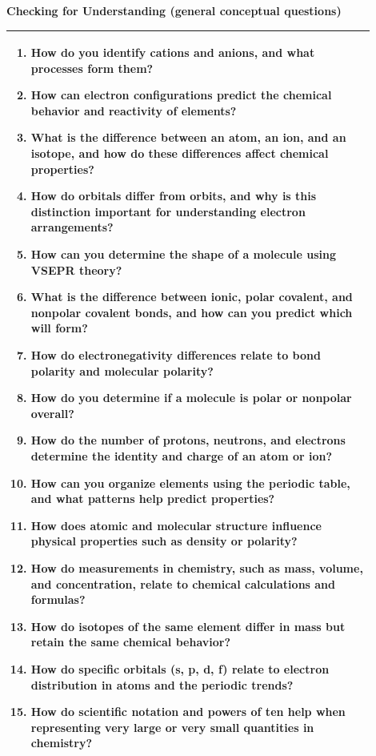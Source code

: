 \documentclass{article}
\begin{document}
{\newpage
{\large\textbf{Checking for Understanding (general conceptual questions)}}\\
\noindent \begin{tabular}{|p{0.9\linewidth}|}
\hline
\vspace{0.2cm}
\begin{enumerate}
    \item How do you identify cations and anions, and what processes form them?
    \item How can electron configurations predict the chemical behavior and reactivity of elements?
    \item What is the difference between an atom, an ion, and an isotope, and how do these differences affect chemical properties?
    \item How do orbitals differ from orbits, and why is this distinction important for understanding electron arrangements?
    \item How can you determine the shape of a molecule using VSEPR theory?
    \item What is the difference between ionic, polar covalent, and nonpolar covalent bonds, and how can you predict which will form?
    \item How do electronegativity differences relate to bond polarity and molecular polarity?
    \item How do you determine if a molecule is polar or nonpolar overall?
    \item How do the number of protons, neutrons, and electrons determine the identity and charge of an atom or ion?
    \item How can you organize elements using the periodic table, and what patterns help predict properties?
    \item How does atomic and molecular structure influence physical properties such as density or polarity?
    \item How do measurements in chemistry, such as mass, volume, and concentration, relate to chemical calculations and formulas?
    \item How do isotopes of the same element differ in mass but retain the same chemical behavior?
    \item How do specific orbitals (s, p, d, f) relate to electron distribution in atoms and the periodic trends?
    \item How do scientific notation and powers of ten help when representing very large or very small quantities in chemistry?
\end{enumerate}
\\
\hline
\end{tabular}
\newpage

}
\end{document}
